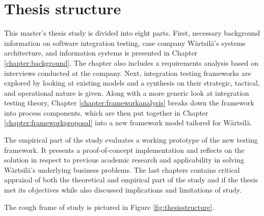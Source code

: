 \documentclass[12pt,a4paper,oneside,pdftex]{report}
\begin{document}
\section{Thesis structure}
\label{section:structure} 

This master's thesis study is divided into eight parts. First, necessary background information on software integration testing, case company Wärtsilä's systems architecture, and information systems is presented in Chapter \ref{chapter:background}. The chapter also includes a requirements analysis based on interviews conducted at the company. Next, integration testing frameworks are explored by looking at existing models and a synthesis on their strategic, tactical, and operational nature is given. Along with a more generic look at integration testing theory, Chapter \ref{chapter:frameworkanalysis} breaks down the framework into process components, which are then put together in Chapter \ref{chapter:frameworkproposal} into a new framework model tailored for Wärtsilä.

The empirical part of the study evaluates a working prototype of the new testing framework. It presents a proof-of-concept implementation and reflects on the solution in respect to previous academic research and applicability in solving Wärtsilä's underlying business problems. The last chapters contains critical appraisal of both the theoretical and empirical part of the study and if the thesis met its objectives while also discussed implications and limitations of study. 

The rough frame of study is pictured in Figure \ref{fig:thesisstructure}.
\end{document}
